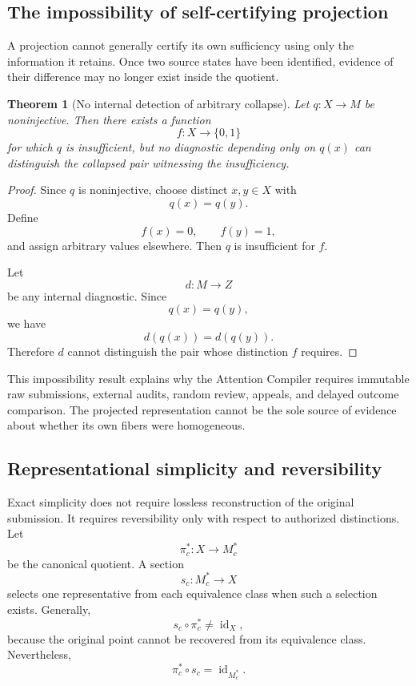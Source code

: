 \documentclass[11pt]{article}
\newtheorem{theorem}[definition]{Theorem}
\theoremstyle{definition}
\begin{document}
\subsection{The impossibility of self-certifying projection}

A projection cannot generally certify its own sufficiency using only the information it retains. Once two source states have been identified, evidence of their difference may no longer exist inside the quotient.

\begin{theorem}[No internal detection of arbitrary collapse]
Let \(q:X\to M\) be noninjective. Then there exists a function
\[
f:X\to\{0,1\}
\]
for which \(q\) is insufficient, but no diagnostic depending only on \(q(x)\) can distinguish the collapsed pair witnessing the insufficiency.
\end{theorem}

\begin{proof}
Since \(q\) is noninjective, choose distinct \(x,y\in X\) with
\[
q(x)=q(y).
\]
Define
\[
f(x)=0,
\qquad
f(y)=1,
\]
and assign arbitrary values elsewhere. Then \(q\) is insufficient for \(f\).

Let
\[
d:M\to Z
\]
be any internal diagnostic. Since
\[
q(x)=q(y),
\]
we have
\[
d(q(x))=d(q(y)).
\]
Therefore \(d\) cannot distinguish the pair whose distinction \(f\) requires.
\end{proof}

This impossibility result explains why the Attention Compiler requires immutable raw submissions, external audits, random review, appeals, and delayed outcome comparison. The projected representation cannot be the sole source of evidence about whether its own fibers were homogeneous.

\subsection{Representational simplicity and reversibility}

Exact simplicity does not require lossless reconstruction of the original submission. It requires reversibility only with respect to authorized distinctions. Let
\[
\pi_c^{*}:X\to M_c^{*}
\]
be the canonical quotient. A section
\[
s_c:M_c^{*}\to X
\]
selects one representative from each equivalence class when such a selection exists. Generally,
\[
s_c\circ\pi_c^{*}\neq\operatorname{id}_X,
\]
because the original point cannot be recovered from its equivalence class. Nevertheless,
\[
\pi_c^{*}\circ s_c
=
\operatorname{id}_{M_c^{*}}.
\]
\end{document}
